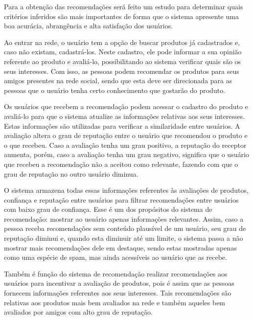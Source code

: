  Para a obtenção das recomendações será feito um estudo para determinar quais critérios inferidos são mais importantes de forma que o sistema apresente uma boa acurácia, abrangência e alta satisfação dos usuários.


 Ao entrar na rede, o usuário tem a opção de buscar produtos já cadastrados e, caso não existam, cadastrá-los. Neste cadastro, ele pode informar a sua opinião referente ao produto e avaliá-lo, possibilitando ao sistema verificar quais são os seus interesses. Com isso, as pessoas podem recomendar os produtos para seus amigos presentes na rede social, sendo que esta deve ser direcionada para as pessoas que o usuário tenha certo conhecimento que gostarão do produto.


 Os usuários que recebem a recomendação podem acessar o cadastro do produto e avaliá-lo para que o sistema atualize as informações relativas aos seus interesses. Estas informações são utilizadas para verificar a similaridade entre usuários. A avaliação altera o grau de reputação entre o usuário que recomendou o produto e o que recebeu. Caso a avaliação tenha um grau positivo, a reputação do receptor aumenta, porém, caso a avaliação tenha um grau negativo, significa que o usuário que recebeu a recomendação não a aceitou como relevante, fazendo com que o grau de reputação no outro usuário diminua.

 O sistema armazena todas essas informações referentes às avaliações de produtos, confiança e reputação entre usuários para filtrar recomendações entre usuários com baixo grau de confiança. Esse é um dos propósitos do sistema de recomendação: mostrar ao usuário apenas informações relevantes. Assim, caso a pessoa receba recomendações sem conteúdo plausível de um usuário, seu grau de reputação diminui e, quando esta diminuir até um limite, o sistema passa a não mostrar mais recomendações dele em destaque, sendo estas mostradas apenas como uma espécie de spam, mas ainda acessíveis ao usuário que as recebe.

 Também é função do sistema de recomendação realizar recomendações aos usuários para incentivar a avaliação de produtos, pois é assim que as pessoas fornecem informações referentes aos seus interesses. Tais recomendações são relativas aos produtos mais bem avaliados na rede e também aqueles bem avaliados por amigos com alto grau de reputação.

